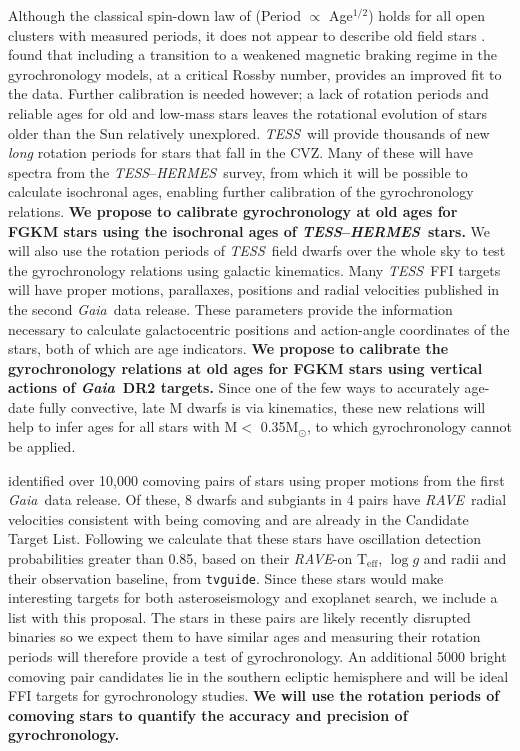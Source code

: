 \documentclass[letterpaper,12pt,preprint]{hack_aastex}
\newcommand{\TESS}{{\it TESS}}
\newcommand{\tess}{{\it TESS}}
\newcommand{\Gaia}{{\it Gaia}}
\newcommand{\RAVE}{{\it RAVE}}
\newcommand{\hermes}{{\it HERMES}}
\newcommand{\HERMES}{{\it HERMES}}
\begin{document}
Although the classical spin-down law of \citet{skumanich1972} (Period
$\propto$ Age$^{1/2}$) holds for all open clusters with measured periods, it
does not appear to describe old field stars \citep{angus2015, van-saders2016}.
\citet{van-saders2016} found that including a transition to a weakened magnetic
braking regime in the gyrochronology models, at a critical Rossby number,
provides an improved fit to the data.
Further calibration is needed however; a lack of rotation periods and reliable
ages for old and low-mass stars leaves the rotational evolution of stars older
than the Sun relatively unexplored.
\TESS\ will provide thousands of new {\it long } rotation periods for stars
that fall in the CVZ.
Many of these will have spectra from the \TESS --\HERMES\ survey, from which
it will be possible to calculate isochronal ages, enabling further calibration
of the gyrochronology relations.
{\bf We propose to calibrate gyrochronology at old ages for FGKM stars using
the isochronal ages of \TESS--\hermes\ stars.}
We will also use the rotation periods of \TESS\ field dwarfs over the whole sky
to test the gyrochronology relations using galactic kinematics.
Many \tess\ FFI targets will have proper motions, parallaxes, positions and
radial velocities published in the second \Gaia\ data release.
These parameters provide the information necessary to calculate galactocentric
positions and action-angle coordinates of the stars, both of which are age
indicators.
{\bf We propose to calibrate the gyrochronology relations at old ages for FGKM
stars using vertical actions of \Gaia\ DR2 targets.}
Since one of the few ways to accurately age-date fully convective, late M
dwarfs is via kinematics, these new relations will help to infer ages for all
stars with M$<$ 0.35M$_\odot$, to which gyrochronology cannot be applied.

\citet{oh2016} identified over 10,000 comoving pairs of stars using proper
motions from the first \Gaia\ data release.
Of these, 8 dwarfs and subgiants in 4 pairs have \RAVE\ radial velocities
consistent with being comoving and are already in the Candidate Target List.
Following \citet{campante2016} we calculate that these stars have oscillation
detection probabilities greater than 0.85, based on their \RAVE-on
T$_{\mathrm{eff}}$, $\log g$ and radii \citep{casey2017} and their observation
baseline, from {\tt tvguide}.
Since these stars would make interesting targets for both asteroseismology and
exoplanet search, we include a list with this proposal.
The stars in these pairs are likely recently disrupted binaries so we
expect them to have similar ages and measuring their rotation periods will
therefore provide a test of gyrochronology.
An additional 5000 bright comoving pair candidates lie in the southern
ecliptic hemisphere and will be ideal FFI targets for gyrochronology studies.
{\bf We will use the rotation periods of comoving stars to quantify the
accuracy and precision of gyrochronology.}
\end{document}
